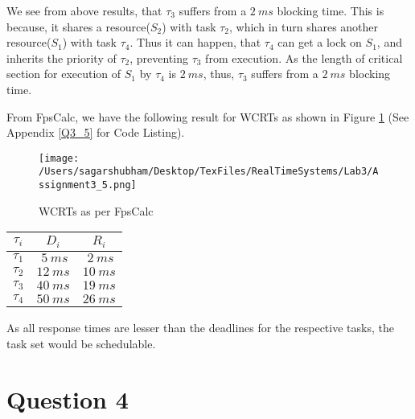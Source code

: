 \documentclass[oneside,a4paper]{article}
\begin{document}
We see from above results, that $\tau_3$ suffers from a $2\ ms$ blocking time. This is because, it shares a resource($S_2$) with task $\tau_2$, which in turn shares another resource($S_1$) with task $\tau_4$. Thus it can happen, that $\tau_4$ can get a lock on $S_1$, and inherits the priority of $\tau_2$, preventing $\tau_3$ from execution. As the length of critical section for execution of $S_1$ by $\tau_4$ is $2\ ms$, thus, $\tau_3$ suffers from a $2\ ms$ blocking time.\par
\pagebreak
From FpsCalc, we have the following result for WCRTs as shown in Figure \ref{fig3_5} (See Appendix \ref{Q3_5} for Code Listing).
\begin{center}
\begin{figure}[H]
                    \centering
                    \texttt{[image: /Users/sagarshubham/Desktop/TexFiles/RealTimeSystems/Lab3/Assignment3\_5.png]}
                    \caption[Figure for Question 3.5]{WCRTs as per FpsCalc}
                    \label{fig3_5}        
\end{figure}
\begin{tabular}{| c | c | c |}
\hline
\textbf{$\tau_i$} & \textbf{$D_i$} & \textbf{$R_i$} \\
\hline
$\tau_1$ & $\ 5\ ms$ & $\ 2\ ms$ \\
$\tau_2$ & $12 \ ms$ & $10\ ms$ \\
$\tau_3$ & $40\ ms$ & $19\ ms$ \\
$\tau_4$ & $50\ ms$ & $26\ ms$ \\
\hline
\end{tabular}

\end{center}\par
As all response times are lesser than the deadlines for the respective tasks, the task set would be schedulable.\par
\pagebreak
\section{Question 4}
\end{document}
